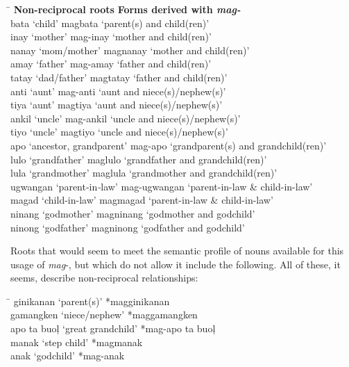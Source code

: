 \newpage
\ea
\begin{tabbing}
\hspace{4.3cm}    \=  \kill
\textbf{Non-reciprocal roots} \> \textbf{Forms derived with \textit{mag-}} \\
bata ‘child’ \> magbata ‘parent(s) and child(ren)’ \\
inay ‘mother’ \> mag-inay ‘mother and child(ren)’ \\
nanay ‘mom/mother’ \> magnanay ‘mother and child(ren)’ \\
amay ‘father’ \> mag{}-amay ‘father and child(ren)’ \\
tatay ‘dad/father’ \> magtatay ‘father and child(ren)’ \\
anti ‘aunt’ \> mag{}-anti ‘aunt and niece(s)/nephew(s)’ \\
tiya ‘aunt’ \> magtiya ‘aunt and niece(s)/nephew(s)’ \\
ankil ‘uncle’ \> mag{}-ankil ‘uncle and niece(s)/nephew(s)’ \\
tiyo ‘uncle’ \> magtiyo ‘uncle and niece(s)/nephew(s)’ \\
apo ‘ancestor, grandparent’ \>  mag{}-apo ‘grandparent(s) and grandchild(ren)’ \\
lulo ‘grandfather’ \> maglulo ‘grandfather and grandchild(ren)’ \\
lula ‘grandmother’ \> maglula ‘grandmother and grandchild(ren)’ \\
ugwangan ‘parent-in\textit{{}-}law’ \> mag{}-ugwangan ‘parent-in-law \& child-in-law’ \\
magad ‘child-in-law’ \> magmagad ‘parent-in-law \& child-in-law’ \\
ninang ‘godmother’ \> magninang ‘godmother and godchild’ \\
ninong ‘godfather’ \> magninong ‘godfather and godchild’
\end{tabbing}
\z

Roots that would seem to meet the semantic profile of nouns available for this usage of \textit{mag}{}-, but which do not allow it include the following. All of these, it seems, describe non-reciprocal relationships:
\ea
\begin{tabbing}
\hspace{5cm}    \=  \kill
ginikanan ‘parent(s)’ \> *magginikanan \\
gamangken ‘niece/nephew’ \> *maggamangken \\
apo ta buoļ ‘great grandchild’ \> *mag{}-apo ta buoļ \\
manak ‘step child’ \> *magmanak \\
anak ‘godchild’ \> *mag{}-anak
\end{tabbing}
\z

